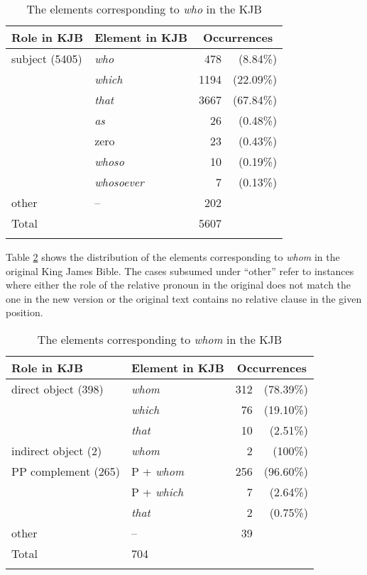\begin{table}
\begin{tabular}{ll r@{~}r}
\lsptoprule
Role in KJB    & {Element in KJB}   & \multicolumn{2}{c}{Occurrences}\\\midrule
subject (5405) & \textit{who}       & {478}  & (8.84\%)\\
{}             & \textit{which}     & {1194} & (22.09\%)\\
{}             & \textit{that}      & {3667} & (67.84\%)\\
{}             & \textit{as}        & {26}   & (0.48\%)\\
{}             & zero               & {23}   & (0.43\%)\\
{}             & \textit{whoso}     & {10}   & (0.19\%)\\
{}             & \textit{whosoever} & {7}    & (0.13\%)\\
\addlinespace
other & -- & 202 & \\
\midrule
Total &    & 5607 & \\
\lspbottomrule
\end{tabular}
\caption{The elements corresponding to \textit{who} in the KJB}
\label{tablekjsubject}
\end{table}

Table \ref{tablekjobject} shows the distribution of the elements corresponding to \textit{whom} in the original King James Bible. The cases subsumed under ``other'' refer to instances where either the role of the relative pronoun in the original does not match the one in the new version or the original text contains no relative clause in the given position.

\begin{table}
\begin{tabular}{ll r@{~}r}
\lsptoprule
Role in KJB & Element in KJB & \multicolumn{2}{c}{Occurrences}\\\midrule
direct object (398) & \textit{whom}  & {312} & (78.39\%)\\
{}                  & \textit{which} & {76}  & (19.10\%)\\
{}                  & \textit{that}  & {10}  & (2.51\%)\\
\addlinespace
indirect object (2) & \textit{whom} & {2} & (100\%)\\
\addlinespace
PP complement (265) & P + \textit{whom} & {256} & (96.60\%)\\
{}                  & P + \textit{which} & {7} & (2.64\%)\\
{}                  & \textit{that} & {2} & (0.75\%)\\
\addlinespace
other & -- & 39 & \\
\midrule
Total & 704  & \\
\lspbottomrule
\end{tabular}
\caption{The elements corresponding to \textit{whom} in the KJB}
\label{tablekjobject}
\end{table}

